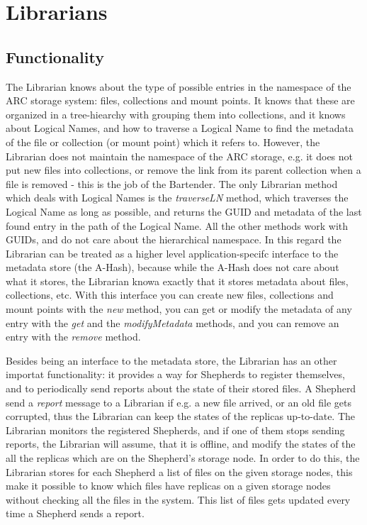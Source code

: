 \documentclass{book}
\begin{document}

\newpage

\section{Librarians} %
\label{sec:librarian}

\subsection{Functionality} %
% 

The Librarian knows about the type of possible entries in the namespace of the ARC storage system: files, collections and mount points. It knows that these are organized in a tree-hiearchy with grouping them into collections, and it knows about Logical Names, and how to traverse a Logical Name to find the metadata of the file or collection (or mount point) which it refers to. However, the Librarian does not maintain the namespace of the ARC storage, e.g. it does not put new files into collections, or remove the link from its parent collection when a file is removed - this is the job of the Bartender. The only Librarian method which deals with Logical Names is the \emph{traverseLN} method, which traverses the Logical Name as long as possible, and returns the GUID and metadata of the last found entry in the path of the Logical Name. All the other methods work with GUIDs, and do not care about the hierarchical namespace. In this regard the Librarian can be treated as a higher level application-specifc interface to the metadata store (the A-Hash), because while the A-Hash does not care about what it stores, the Librarian knowa exactly that it stores metadata about files, collections, etc. With this interface you can create new files, collections and mount points with the \emph{new} method, you can get or modify the metadata of any entry with the \emph{get} and the \emph{modifyMetadata} methods, and you can remove an entry with the \emph{remove} method.

Besides being an interface to the metadata store, the Librarian has an other importat functionality: it provides a way for Shepherds to register themselves, and to periodically send reports about the state of their stored files. A Shepherd send a \emph{report} message to a Librarian if e.g. a new file arrived, or an old file gets corrupted, thus the Librarian can keep the states of the replicas up-to-date. The Librarian monitors the registered Shepherds, and if one of them stops sending reports, the Librarian will assume, that it is offline, and modify the states of the all the replicas which are on the Shepherd's storage node. In order to do this, the Librarian stores for each Shepherd a list of files on the given storage nodes, this make it possible to know which files have replicas on a given storage nodes without checking all the files in the system. This list of files gets updated every time a Shepherd sends a report.
\end{document}
